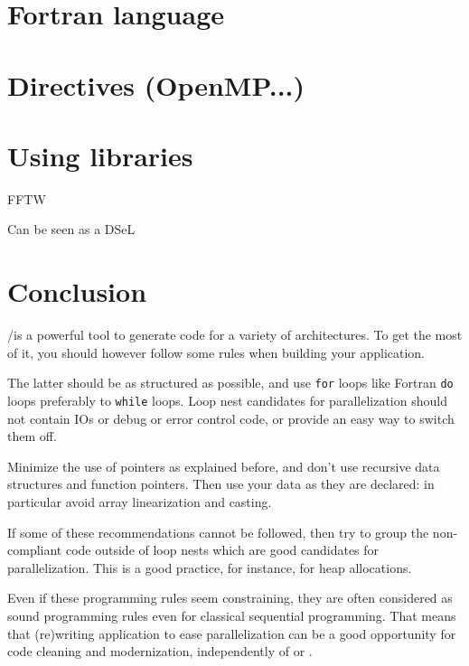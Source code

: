 \documentclass[a4paper]{article}
\begin{document}
\section{Fortran language}
\label{sec:fortran-language}


\section{Directives (OpenMP...)}
\label{sec:directives}


\section{Using libraries}
\label{sec:using-libraries}

FFTW

Can be seen as a DSeL


\section{Conclusion}
\label{sec:conclusion}

\Apips/\Apfa is a powerful tool to generate code for a variety
of architectures. To get the most of it, you should however follow
some rules when building your application.

The latter should be as structured as possible, and use
\lstinline{for} loops like Fortran \lstinline|do| loops preferably to
\lstinline{while} loops. Loop nest candidates for parallelization should
not contain IOs or debug or error control code, or provide an easy way
to switch them off.

Minimize the use of pointers as explained before, and don't use
recursive data structures and function pointers. Then use your data as they are
declared: in particular avoid array linearization and casting.

If some of these recommendations cannot be followed, then try to group
the non-compliant code outside of loop nests which are good
candidates for parallelization.  This is a good practice, for instance,
for heap allocations.

Even if these programming rules seem constraining, they are often
considered as sound programming rules even for classical sequential
programming. That means that (re)writing application to ease
parallelization can be a good opportunity for code cleaning and
modernization, independently of \Apips or \Apfa.


\end{document}
